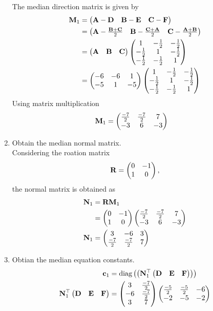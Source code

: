 \documentclass[11pt]{book}
\begin{document}
\begin{enumerate}[label=\thesubsection.\arabic*.,ref=\thesubsection.\theenumi]
\solution The median direction matrix is given by 
\begin{align}
			\mathbf{M}_1 &= \begin{pmatrix}\mathbf{A}-\mathbf{D} & \mathbf{B}-\mathbf{E} & \mathbf{C}-\mathbf{F}\end{pmatrix}
			\\
			&= 
			  \begin{pmatrix}
				  \mathbf{A}-\frac{\mathbf{B}+\mathbf{C}}{2} &
			  \mathbf{B}-\frac{\mathbf{C}+\mathbf{A}}{2} &
			  \mathbf{C}-\frac{\mathbf{A}+\mathbf{B}}{2}\end{pmatrix} 
			  \\
			  &= \begin{pmatrix}\mathbf{A} & \mathbf{B} &\mathbf{C}\end{pmatrix}
			  \begin{pmatrix}
				  1 & -\frac{1}{2} & -\frac{1}{2}
				  \\
				  -\frac{1}{2} & 1 & -\frac{1}{2}
				  \\
				  -\frac{1}{2} & -\frac{1}{2} & 1
				  \end{pmatrix} 
      \\
      &= \begin{pmatrix}-6 & -6 & 1 \\ -5 & 1 & -5\end{pmatrix}\begin{pmatrix}
				  1 & -\frac{1}{2} & -\frac{1}{2}
				  \\
				  -\frac{1}{2} & 1 & -\frac{1}{2}
				  \\
				  -\frac{1}{2} & -\frac{1}{2} & 1
				  \end{pmatrix} 
		\end{align}
  Using matrix multiplication 
  \begin{align}
   \mathbf{M}_1 &=   \begin{pmatrix}\frac{-7}{2} & \frac{-7}{2} & 7 \\ -3 & 6 & -3\end{pmatrix}
  \end{align}
\item Obtain the median normal matrix. \\
\solution Considering the roation matrix
\begin{align}
\mathbf{R}  = \begin{pmatrix}0 & -1 \\ 1 & 0\end{pmatrix},
\end{align}
the normal matrix is obtained as
\begin{align}
\mathbf{N}_1 &= \mathbf{R}\mathbf{M}_1  \\
&=\begin{pmatrix}0 & -1 \\ 1 & 0\end{pmatrix} \begin{pmatrix}\frac{-7}{2} & \frac{-7}{2} & 7 \\ -3 & 6 & -3\end{pmatrix} \\
\mathbf{N}_1 &=  \begin{pmatrix} 3 & -6 & 3 \\ \frac{-7}{2} & \frac{-7}{2} & 7 \end{pmatrix}
\end{align}
\item Obtian the median equation constants. \\
\begin{align}
\vec{c}_1 &= \text{diag}\brak{\brak{\vec{N}_1^{\top}\myvec{\vec{D} & \vec{E} & \vec{F} }}}  \\
\vec{N}_1^{\top}\myvec{\vec{D} & \vec{E} & \vec{F} } &= \myvec{3&\frac{-7}{2} \\ -6&\frac{-7}{2} \\ 3 & 7}\myvec{\frac{-5}{2} & \frac{-5}{2} & -6 \\ -2 & -5 & -2} \\

\end{align}
\end{enumerate}
\end{document}
